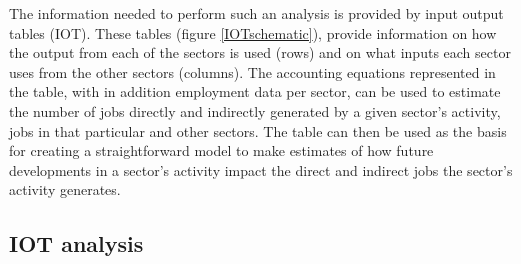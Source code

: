 \documentclass[12pt,english]{article}
\begin{document}

The information needed to perform such an analysis is provided by input output tables (IOT). These tables (figure \ref{IOTschematic}), provide information on how the output from each of the sectors is used (rows) and on what inputs each sector uses from the other sectors (columns). The accounting equations represented in the table, with in addition employment data per sector, can be used to estimate the number of jobs directly and indirectly generated by a given sector's activity, jobs in that particular and other sectors. The table can then be used as the basis for creating a straightforward model to make estimates of how future developments in a sector's activity impact the direct and indirect jobs the sector's activity generates.








\subsection{IOT analysis}
\end{document}
